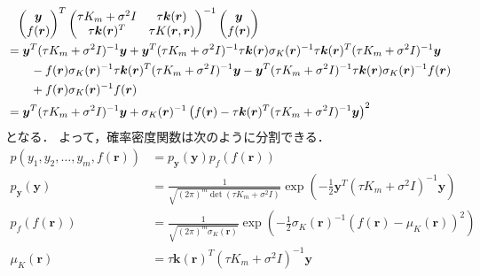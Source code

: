 \begin{align}
     & \hphantom{=}
    \begin{pmatrix}
        \bm{y} \\ f(\bm{r})
    \end{pmatrix}^T
    \begin{pmatrix}
        \tau K_m + \sigma^2 I & \tau \bm{k}(\bm{r})    \\
        \tau \bm{k}(\bm{r})^T & \tau K(\bm{r}, \bm{r})
    \end{pmatrix}^{-1}
    \begin{pmatrix}
        \bm{y} \\ f(\bm{r})
    \end{pmatrix}
    \notag                                            \\
     & = \bm{y}^T (\tau K_m + \sigma^2 I)^{-1} \bm{y}
    + \bm{y}^T (\tau K_m + \sigma^2 I)^{-1} \tau \bm{k}(\bm{r}) \sigma_K(\bm{r})^{-1} \tau \bm{k}(\bm{r})^T (\tau K_m + \sigma^2 I)^{-1} \bm{y}
    \notag                                            \\ & \hspace{2em}
    - f(\bm{r}) \sigma_K(\bm{r})^{-1} \tau \bm{k}(\bm{r})^T (\tau K_m + \sigma^2 I)^{-1} \bm{y}
    - \bm{y}^T (\tau K_m + \sigma^2 I)^{-1} \tau \bm{k}(\bm{r}) \sigma_K(\bm{r})^{-1} f(\bm{r})
    \notag                                            \\ & \hspace{2em}
    + f(\bm{r}) \sigma_K(\bm{r})^{-1} f(\bm{r})
    \notag                                            \\
     & = \bm{y}^T (\tau K_m + \sigma^2 I)^{-1} \bm{y}
    + \sigma_K(\bm{r})^{-1} \left(f(\bm{r}) - \tau \bm{k}(\bm{r})^T (\tau K_m + \sigma^2 I)^{-1} \bm{y}\right)^2
\end{align}
となる．
よって，確率密度関数は次のように分割できる．
\begin{align}
    p(y_1, y_2, \ldots, y_m, f(\bm{r}))
     & = p_{\bm{y}}(\bm{y}) p_f(f(\bm{r}))
    \\
    p_{\bm{y}}(\bm{y})
     & = \frac{1}{\sqrt{(2\pi)^{m} \det(\tau K_m + \sigma^2 I)}}
    \exp\left(-\frac{1}{2} \bm{y}^T (\tau K_m + \sigma^2 I)^{-1} \bm{y} \right)
    \\
    p_f(f(\bm{r}))
     & = \frac{1}{\sqrt{(2\pi)^{m} \sigma_K(\bm{r})}}
    \exp\left(-\frac{1}{2} \sigma_K(\bm{r})^{-1} \left(f(\bm{r}) - \mu_K(\bm{r})\right)^2\right)
    \\
    \mu_K(\bm{r})
     & = \tau \bm{k}(\bm{r})^T (\tau K_m + \sigma^2 I)^{-1} \bm{y}
\end{align}
